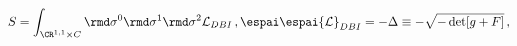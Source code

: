 \begin{equation} \label{delta}
S= \int_{\CR^{1,1} \times C} \rmd \sigma^0 \rmd \sigma^1 \rmd \sigma^2
{\cal L}_{DBI}\,, \espai \espai {\cal L}_{DBI}=-\Delta\equiv
-\sqrt{-\det[g+F]}\,,
\end{equation}

